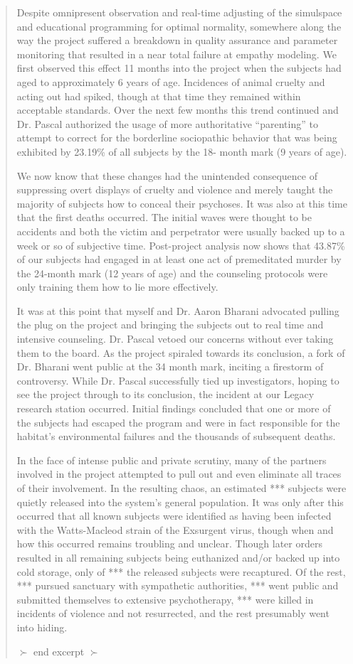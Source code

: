 \begin{quotation}
Despite omnipresent observation and real-time adjusting of the simulspace and educational programming for optimal normality, somewhere along the way the project suffered a breakdown in quality assurance and parameter monitoring that resulted in a near total failure at empathy modeling. We first observed this effect 11 months into the project when the subjects had aged to approximately 6 years of age. Incidences of animal cruelty and acting out had spiked, though at that time they remained within acceptable standards. Over the next few months this trend continued and Dr. Pascal authorized the usage of more authoritative “parenting” to attempt to correct for the borderline sociopathic behavior that was being exhibited by 23.19\% of all subjects by the 18- month mark (9 years of age). 

We now know that these changes had the unintended consequence of suppressing overt displays of cruelty and violence and merely taught the majority of subjects how to conceal their psychoses. It was also at this time that the first deaths occurred. The initial waves were thought to be accidents and both the victim and perpetrator were usually backed up to a week or so of subjective time. Post-project analysis now shows that 43.87\% of our subjects had engaged in at least one act of premeditated murder by the 24-month mark (12 years of age) and the counseling protocols were only training them how to lie more effectively. 

It was at this point that myself and Dr. Aaron Bharani advocated pulling the plug on the project and bringing the subjects out to real time and intensive counseling. Dr. Pascal vetoed our concerns without ever taking them to the board. As the project spiraled towards its conclusion, a fork of Dr. Bharani went public at the 34 month mark, inciting a firestorm of controversy. While Dr. Pascal successfully tied up investigators, hoping to see the project through to its conclusion, the incident at our Legacy research station occurred. Initial findings concluded that one or more of the subjects had escaped the program and were in fact responsible for the habitat’s environmental failures and the thousands of subsequent deaths. 

In the face of intense public and private scrutiny, many of the partners involved in the project attempted to pull out and even eliminate all traces of their involvement. In the resulting chaos, an estimated *** subjects were quietly released into the system’s general population. It was only after this occurred that all known subjects were identified as having been infected with the Watts-Macleod strain of the Exsurgent virus, though when and how this occurred remains troubling and unclear. Though later orders resulted in all remaining subjects being euthanized and/or backed up into cold storage, only of *** the released subjects were recaptured. Of the rest, *** pursued sanctuary with sympathetic authorities, *** went public and submitted themselves to extensive psychotherapy, *** were killed in incidents of violence and not resurrected, and the rest presumably went into hiding. 

$\succ$ end excerpt $\succ$ \end{quotation} 
